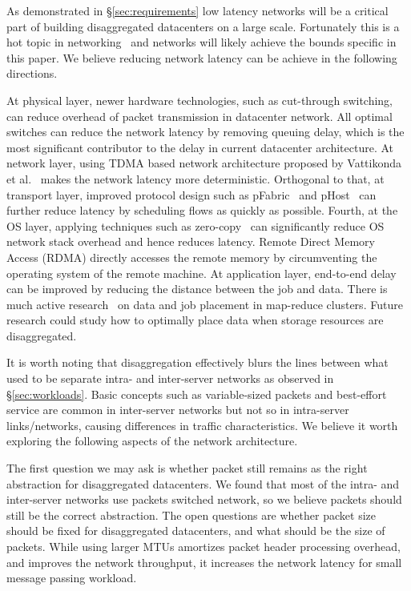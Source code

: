 As demonstrated in \S\ref{sec:requirements} low latency networks will be a critical part of building  disaggregated datacenters on a large scale. Fortunately this is a hot topic in networking~\cite{lowlatency} and networks will likely achieve the bounds specific in this paper.
We believe reducing network latency can be achieve in the following directions.

At physical layer, newer hardware technologies, such as cut-through switching, can reduce overhead of packet transmission in datacenter network. All optimal switches can reduce the network latency by removing queuing delay, which is the most significant contributor to the delay in current datacenter architecture.
At network layer, using TDMA based network architecture proposed by Vattikonda et al.~\cite{tdma} makes the network latency more deterministic. 
Orthogonal to that, at transport layer, improved protocol design such as pFabric~\cite{pfabric} and pHost~\cite{phost} can further reduce latency by scheduling flows as quickly as possible. 
Fourth, at the OS layer, applying techniques such as zero-copy~\cite{netmap} can significantly reduce OS network stack overhead and hence reduces latency.
Remote Direct Memory Access (RDMA) directly accesses the remote memory by circumventing the operating system of the remote machine.
At application layer, end-to-end delay can be improved by reducing the distance between the job and data. There is much active research~\cite{endpoint} on data and job placement in map-reduce clusters. Future research could study how to optimally place data when storage resources are disaggregated.

It is worth noting that disaggregation effectively blurs the lines between what used to be separate intra- and inter-server networks as observed in \S\ref{sec:workloads}. 
Basic concepts such as variable-sized packets and best-effort service are common in inter-server networks but not so in intra-server links/networks, causing differences in traffic characteristics. 
We believe it worth exploring the following aspects of the network architecture.

The first question we may ask is whether packet still remains as the right abstraction for disaggregated datacenters. 
We found that most of the intra- and inter-server networks use packets switched network, so we believe packets should still be the correct abstraction. 
The open questions are whether packet size should be fixed for disaggregated datacenters, and what should be the size of packets. 
While using larger MTUs amortizes packet header processing overhead, and improves the network throughput, it increases the network latency for small message passing workload.

